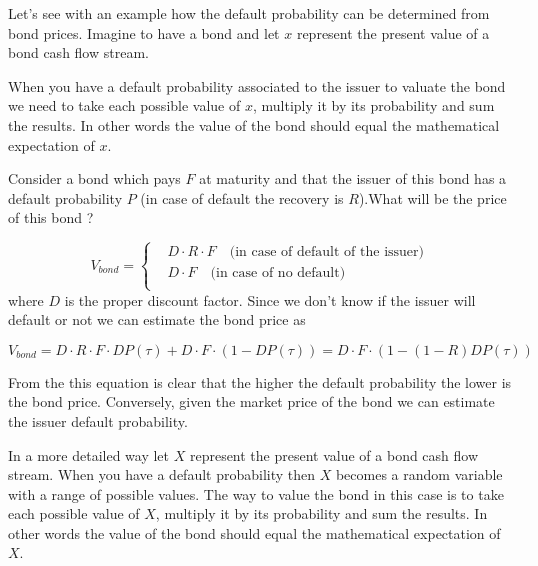 Let's see with an example how the default probability can be determined
from bond prices. Imagine to have a bond and let \(x\) represent the
present value of a bond cash flow stream.

When you have a default probability associated to the issuer to valuate
the bond we need to take each possible value of \(x\), multiply it by
its probability and sum the results. In other words the value of the
bond should equal the mathematical expectation of \(x\).

Consider a bond which pays \(F\) at maturity and that the issuer of this
bond has a default probability \(P\) (in case of default the recovery is
\(R\)).What will be the price of this bond ?

\begin{equation}
V_{bond} =
\begin{cases}
& D \cdot R \cdot F\quad\textrm{(in case of default of the issuer)}\\
&D \cdot F\quad\textrm{(in case of no default)}\\
\end{cases}\end{equation} 
where \(D\) is the proper discount factor. Since we don't
know if the issuer will default or not we can estimate the bond price as

\begin{equation}
V_{bond} = D \cdot R \cdot F \cdot DP ( \tau ) + D \cdot F \cdot ( 1 − DP ( \tau)) = D\cdot F \cdot ( 1 − ( 1 − R ) DP ( \tau ))\end{equation}

From the this equation is clear that the higher the default probability
the lower is the bond price. Conversely, given the market price of the
bond we can estimate the issuer default probability.

%

In a more detailed way let $X$ represent the present value of a bond cash flow stream. When you
have a default probability then $X$ becomes a random variable with a range
of possible values. The way
to value the bond in this case is to take each possible value of $X$, multiply it
by its probability and sum the results. In other words the value of the bond
should equal the mathematical expectation of $X$.

